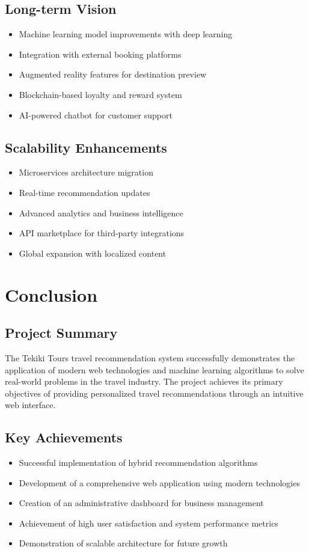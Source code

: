 \documentclass[12pt,a4paper]{article}
\begin{document}
\subsection{Long-term Vision}
\begin{itemize}
    \item Machine learning model improvements with deep learning
    \item Integration with external booking platforms
    \item Augmented reality features for destination preview
    \item Blockchain-based loyalty and reward system
    \item AI-powered chatbot for customer support
\end{itemize}

\subsection{Scalability Enhancements}
\begin{itemize}
    \item Microservices architecture migration
    \item Real-time recommendation updates
    \item Advanced analytics and business intelligence
    \item API marketplace for third-party integrations
    \item Global expansion with localized content
\end{itemize}

\newpage

\section{Conclusion}

\subsection{Project Summary}
The Tekiki Tours travel recommendation system successfully demonstrates the application of modern web technologies and machine learning algorithms to solve real-world problems in the travel industry. The project achieves its primary objectives of providing personalized travel recommendations through an intuitive web interface.

\subsection{Key Achievements}
\begin{itemize}
    \item Successful implementation of hybrid recommendation algorithms
    \item Development of a comprehensive web application using modern technologies
    \item Creation of an administrative dashboard for business management
    \item Achievement of high user satisfaction and system performance metrics
    \item Demonstration of scalable architecture for future growth
\end{itemize}
\end{document}
